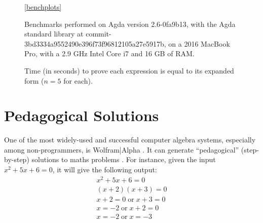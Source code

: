 \documentclass[acmsmall,review,anonymous]{acmart}\settopmatter{printfolios=true,printccs=false,printacmref=false}
\begin{document}
\begin{figure}
  \begin{subfigure}[t]{0.3\textwidth}
    \label{bench3}
  \end{subfigure}
  \ref{benchplots}
  \caption{Time (in seconds) to prove each expression is equal to its expanded
    form ($n = 5$ for each).}
  \label{benchmarks}
  \smallskip
  \begin{flushleft}
  \footnotesize
  Benchmarks performed on Agda version 2.6-0fa9b13, with the Agda standard
  library at commit-3bd3334a9552490e396f73f96812105a27e5917b, on a 2016 MacBook
  Pro, with a 2.9 GHz Intel Core i7 and 16 GB of RAM.
  \end{flushleft}
\end{figure}
\section{Pedagogical Solutions}
One of the most widely-used and successful computer algebra systems, especially
among non-programmers, is Wolfram|Alpha
\cite{wolfram_research_inc._wolframalpha_2019}. It can generate ``pedagogical''
(step-by-step) solutions to maths
problems \cite{the_development_team_step-by-step_2009}. For instance, given the
input \(x^2 + 5 x + 6 = 0\), it will give the following output:
\begin{align*}
  x^2 + 5x + 6   = 0 \\
  (x + 2)(x + 3) = 0 \\
  x + 2 = 0   \; \text{or} \; x + 3 = 0 \\
  x     = -2  \; \text{or} \; x + 2 = 0 \\
  x     = -2  \; \text{or} \; x     = -3
\end{align*}
\end{document}
